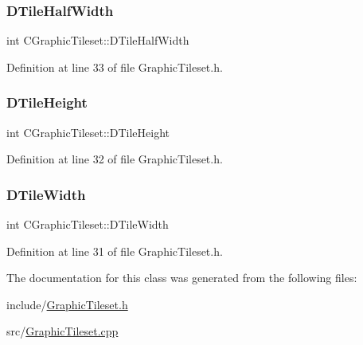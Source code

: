 \subsubsection{\texorpdfstring{D\+Tile\+Half\+Width}{DTileHalfWidth}}
{\footnotesize\ttfamily int C\+Graphic\+Tileset\+::\+D\+Tile\+Half\+Width\hspace{0.3cm}{\ttfamily [protected]}}



Definition at line 33 of file Graphic\+Tileset.\+h.

\hypertarget{classCGraphicTileset_af48f32e07d5fe69afd5f764318cc3244}{}\label{classCGraphicTileset_af48f32e07d5fe69afd5f764318cc3244} 
\subsubsection{\texorpdfstring{D\+Tile\+Height}{DTileHeight}}
{\footnotesize\ttfamily int C\+Graphic\+Tileset\+::\+D\+Tile\+Height\hspace{0.3cm}{\ttfamily [protected]}}



Definition at line 32 of file Graphic\+Tileset.\+h.

\hypertarget{classCGraphicTileset_a2d0c7d19865b81911a3a43d5cae50e00}{}\label{classCGraphicTileset_a2d0c7d19865b81911a3a43d5cae50e00} 
\subsubsection{\texorpdfstring{D\+Tile\+Width}{DTileWidth}}
{\footnotesize\ttfamily int C\+Graphic\+Tileset\+::\+D\+Tile\+Width\hspace{0.3cm}{\ttfamily [protected]}}



Definition at line 31 of file Graphic\+Tileset.\+h.



The documentation for this class was generated from the following files\+:\begin{DoxyCompactItemize}
\item 
include/\hyperlink{GraphicTileset_8h}{Graphic\+Tileset.\+h}\item 
src/\hyperlink{GraphicTileset_8cpp}{Graphic\+Tileset.\+cpp}\end{DoxyCompactItemize}
